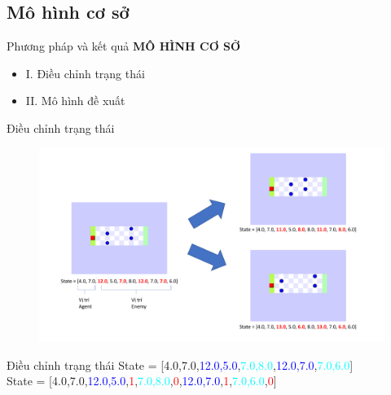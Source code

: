 \documentclass{beamer}
\begin{document}
\subsection{Mô hình cơ sở}
\begin{frame}{Phương pháp và kết quả}
	\centering
	\huge\textbf{MÔ HÌNH CƠ SỞ}
	\vfill
	\begin{itemize}
	    \item \small I.  Điều chỉnh trạng thái
	    \item \small II. Mô hình đề xuất
	\end{itemize}
\end{frame}
\begin{frame}{Điều chỉnh trạng thái}
	\begin{figure}
		\centering
		\includegraphics[scale=0.3]{Pic/conflict_enemy_position}
	\end{figure}
\end{frame}
\begin{frame}{Điều chỉnh trạng thái}
	\centering
	State = [4.0,7.0,\textcolor{blue}{12.0,5.0},\textcolor{cyan}{7.0,8.0},\textcolor{blue}{12.0,7.0},\textcolor{cyan}{7.0,6.0}]\\
	\hspace{1cm}
	\vfill
	State = [4.0,7.0,\textcolor{blue}{12.0,5.0},\textcolor{red}{1},\textcolor{cyan}{7.0,8.0},\textcolor{red}{0},\textcolor{blue}{12.0,7.0},\textcolor{red}{1},\textcolor{cyan}{7.0,6.0},\textcolor{red}{0}]
\end{frame}
\end{document}
